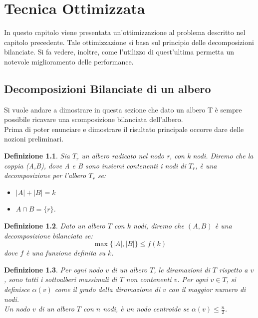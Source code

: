 \chapter{Tecnica Ottimizzata}
\label{cap:3}
In questo capitolo viene presentata un'ottimizzazione al problema descritto nel capitolo precedente.
Tale ottimizzazione si basa sul principio delle decomposizioni bilanciate.
Si fa vedere, inoltre, come l'utilizzo di quest'ultima permetta un notevole miglioramento delle performance.

\section{Decomposizioni Bilanciate di un albero}
\label{cap:3 par:1}
Si vuole andare a dimostrare in questa sezione che dato un albero T \`e sempre possibile ricavare una scomposizione bilanciata dell'albero.
\\
Prima di poter enunciare e dimostrare il risultato principale occorre dare delle nozioni preliminari.

\newtheorem{definizione}{Definizione}[section]

\begin{definizione}
	\label{definizioneDeco}
Sia $T_r$ un albero radicato nel nodo r, con k nodi.
Diremo che la coppia (A,B), dove  A e B sono insiemi contenenti i nodi di $T_r$, \`e una decomposizione per l'albero $ T_r $ se:
\begin{itemize}
	\item $| A | + | B | = k$
	\item $A \cap B = \{r\}$.
\end{itemize}
\end{definizione}


\begin{definizione}
\label{lemmaDeco}
Dato un albero $ T $ con $ k $ nodi, diremo che $ (A,B) $ \`e una decomposizione bilanciata se:
\begin{equation*}
	\max{ \{|A| , |B| \} }  \le  f(k)
\end{equation*}
dove $ f $ \`e una funzione definita su $ k $.
\end{definizione}





\begin{definizione}
Per ogni nodo $ v $ di un albero $ T $, le diramazioni di $ T $  rispetto a $ v $, sono tutti i sottoalberi massimali di $ T $ non contenenti $ v $. 
Per ogni $ v \in T $, si definisce $\alpha(v)$ come il grado della diramazione di $ v $ con il maggior numero di nodi.\\
Un nodo $ v $ di un albero $ T $ con $ n $ nodi, \`e un nodo centroide se $\alpha(v)\le\frac{n}{2}$.
\end{definizione}\mbox{}


